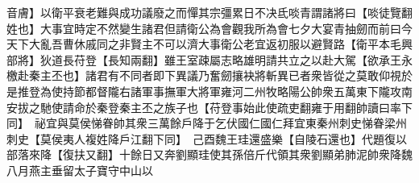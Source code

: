 音膚】以衛平衰老難與成功議廢之而憚其宗彊累日不决氐啖青謂諸將曰【啖徒覽翻姓也】大事宜時定不然變生諸君但請衛公為會觀我所為會七夕大宴青抽劒而前曰今天下大亂吾曹休戚同之非賢主不可以濟大事衛公老宜返初服以避賢路【衛平本毛興部將】狄道長苻登【長知兩翻】雖王室疎屬志略雄明請共立之以赴大駕【欲承王永檄赴秦主丕也】諸君有不同者即下異議乃奮劒攘袂將斬異已者衆皆從之莫敢仰視於是推登為使持節都督隴右諸軍事撫軍大將軍雍河二州牧略陽公帥衆五萬東下隴攻南安拔之馳使請命於秦登秦主丕之族子也【苻登事始此使疏吏翻雍于用翻帥讀曰率下同】　祕宜與莫侯悌眷帥其衆三萬餘戶降于乞伏國仁國仁拜宜東秦州刺史悌眷梁州刺史【莫侯夷人複姓降戶江翻下同】　己酉魏王珪還盛樂【自陵石還也】代題復以部落來降【復扶又翻】十餘日又奔劉顯珪使其孫倍斤代領其衆劉顯弟肺泥帥衆降魏　八月燕主垂留太子寶守中山以